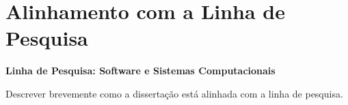 \chapter*{Alinhamento com a Linha de Pesquisa} 


\textbf{Linha de Pesquisa: Software e Sistemas Computacionais}

\vspace{1cm}

Descrever brevemente como a dissertação está alinhada com a linha de pesquisa.

